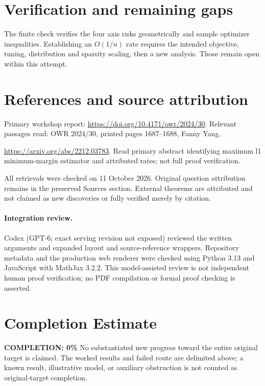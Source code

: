 \documentclass[11pt]{article}
\begin{document}
\section{Verification and remaining gaps}
The finite check verifies the four axis risks geometrically and sample optimizer inequalities. Establishing an $O(1/n)$ rate requires the intended objective, tuning, distribution and sparsity scaling, then a new analysis. Those remain open within this attempt.

\section{References and source attribution}
Primary workshop report: \url{https://doi.org/10.4171/owr/2024/30}. Relevant passages read: OWR 2024/30, printed pages 1687--1688, Fanny Yang.

\url{https://arxiv.org/abs/2212.03783}. Read primary abstract identifying maximum l1 minimum-margin estimator and attributed rates; not full proof verification.

All retrievals were checked on 11 October 2026. Original question attribution remains in the preserved Sources section. External theorems are attributed and not claimed as new discoveries or fully verified merely by citation.


\paragraph{Integration review.} Codex (GPT-6; exact serving revision not exposed) reviewed the written arguments and expanded layout and source-reference wrappers. Repository metadata and the production web renderer were checked using Python 3.13 and JavaScript with MathJax 3.2.2. This model-assisted review is not independent human proof verification; no PDF compilation or formal proof checking is asserted.

\section{Completion Estimate}
\noindent\textbf{COMPLETION: 0\%}
No substantiated new progress toward the entire original target is claimed. The worked results and failed route are delimited above; a known result, illustrative model, or auxiliary obstruction is not counted as original-target completion.
\end{document}
